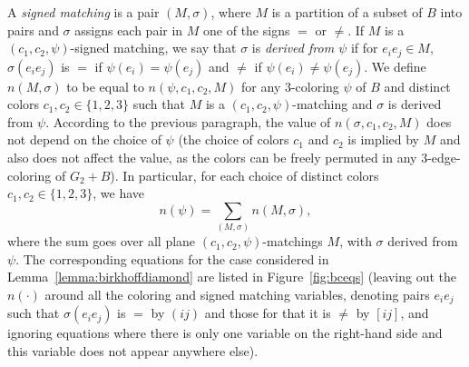 \documentclass[12pt,twoside,openright,a4paper]{book}
\begin{document}
A \emph{signed matching} is a pair $(M,\sigma)$, where $M$ is a partition of a subset of $B$ into pairs and $\sigma$ assigns each pair in $M$ one of the signs $=$ or $\neq$.
If $M$ is a $(c_1,c_2,\psi)$-signed matching, we say that $\sigma$ is \emph{derived from $\psi$} if for $e_ie_j\in M$, $\sigma(e_ie_j)$ is $=$ if $\psi(e_i)=\psi(e_j)$
and $\neq$ if $\psi(e_i)\neq\psi(e_j)$.  We define $n(M,\sigma)$ to be equal to $n(\psi,c_1,c_2,M)$ for any $3$-coloring $\psi$ of $B$ and distinct colors $c_1,c_2\in \{1,2,3\}$ such that
$M$ is a $(c_1,c_2,\psi)$-matching and $\sigma$ is derived from $\psi$.  According to the previous paragraph, the value of $n(\sigma,c_1,c_2,M)$ does not depend on the choice of $\psi$
(the choice of colors $c_1$ and $c_2$ is implied by $M$ and also does not affect the value, as the colors can be freely permuted in any $3$-edge-coloring of $G_2+B$).
In particular, for each choice of distinct colors $c_1,c_2\in\{1,2,3\}$, we have
$$n(\psi)=\sum_{(M,\sigma)} n(M,\sigma),$$
where the sum goes over all plane $(c_1,c_2,\psi)$-matchings $M$, with $\sigma$ derived from $\psi$.
The corresponding equations for the case considered in Lemma~\ref{lemma:birkhoffdiamond} are listed in Figure~\ref{fig:bceqs}
(leaving out the $n(\cdot)$ around all the coloring and signed matching variables, denoting pairs $e_ie_j$ such that $\sigma(e_ie_j)$ is $=$ by $(ij)$ and those for that it is $\neq$ by $[ij]$,
and ignoring equations where there is only one variable on the right-hand side and this variable does not appear anywhere else).
\end{document}
